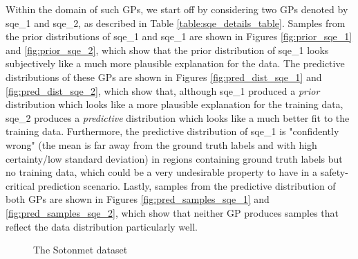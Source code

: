 \documentclass{article}
\begin{document}
Within the domain of such GPs, we start off by considering two GPs denoted by sqe\_1 and sqe\_2, as described in Table \ref{table:sqe_details_table}. Samples from the prior distributions of sqe\_1 and sqe\_1 are shown in Figures \ref{fig:prior_sqe_1} and \ref{fig:prior_sqe_2}, which show that the prior distribution of sqe\_1 looks subjectively like a much more plausible explanation for the data. The predictive distributions of these GPs are shown in Figures \ref{fig:pred_dist_sqe_1} and \ref{fig:pred_dist_sqe_2}, which show that, although sqe\_1 produced a \emph{prior} distribution which looks like a more plausible explanation for the training data, sqe\_2 produces a \emph{predictive} distribution which looks like a much better fit to the training data. Furthermore, the predictive distribution of sqe\_1 is "confidently wrong" (the mean is far away from the ground truth labels and with high certainty/low standard deviation) in regions containing ground truth labels but no training data, which could be a very undesirable property to have in a safety-critical prediction scenario. Lastly, samples from the predictive distribution of both GPs are shown in Figures \ref{fig:pred_samples_sqe_1} and \ref{fig:pred_samples_sqe_2}, which show that neither GP produces samples that reflect the data distribution particularly well.

\appendix


\begin{figure}[pht]
    \centering
    \caption{The Sotonmet dataset}
    \label{fig:sotonmet}
\end{figure}
\end{document}
